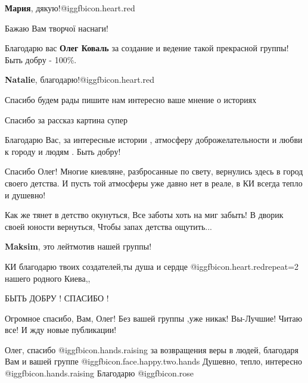 \begin{itemize}
\begin{itemize} %
\textbf{Мария}, дякую!@igg{fbicon.heart.red}
\end{itemize} %

Бажаю Вам творчої наснаги!

Благодарю вас \textbf{Олег Коваль} за создание и ведение такой прекрасной группы!
Быть добру - 100\%.

\begin{itemize} %
\textbf{Natalie}, благодарю!@igg{fbicon.heart.red}
\end{itemize} %

Спасибо будем рады пишите нам интересно ваше мнение о историях

Спасибо за рассказ картина супер

Благодарю Вас, за интересные истории , атмосферу доброжелательности и любви к городу и людям .
Быть добру!


Спасибо Олег! Многие киевляне, разбросанные по свету, вернулись здесь в город
своего детства. И пусть той атмосферы уже давно нет в реале, в КИ всегда тепло
и душевно!



\obeycr
Как же тянет в детство окунуться,
Все заботы хоть на миг забыть!
В дворик своей юности вернуться,
Чтобы запах детства ощутить...
\restorecr

\begin{itemize} %
\textbf{Maksim}, это лейтмотив нашей группы!
\end{itemize} %

КИ благодарю твоих создателей,ты душа и сердце @igg{fbicon.heart.red}{repeat=2}
нашего родного Киева,,

 БЫТЬ ДОБРУ !  СПАСИБО !

 Огромное спасибо, Вам, Олег! Без вашей группы ,уже
никак! Вы-Лучшие! Читаю все! И жду новые публикации!


Олег, спасибо  @igg{fbicon.hands.raising}  за возвращения веры в людей,
благодаря Вам и вашей группе  @igg{fbicon.face.happy.two.hands} Душевно, тепло,
интересно  @igg{fbicon.hands.raising}  Благодарю  @igg{fbicon.rose} 


\end{itemize}
